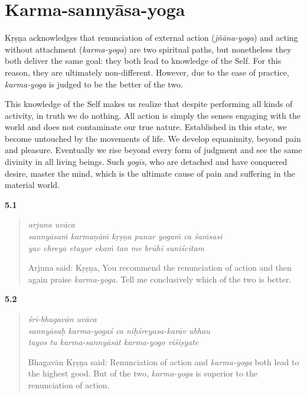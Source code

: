 \chapter{Karma-sannyāsa-yoga}\label{chap-karma-sannyasa-yoga}


\noindent Kṛṣṇa acknowledges that renunciation of external action (\textit{jñāna-yoga}) and acting without attachment (\textit{karma-yoga}) are two spiritual paths, but nonetheless they both deliver the same goal: they both lead to knowledge of the Self. For this reason, they are ultimately non-different. However, due to the ease of practice, \textit{karma-yoga} is judged to be the better of the two.

This knowledge of the Self makes us realize that despite performing all kinds of activity, in truth we do nothing. All action is simply the senses engaging with the world and does not contaminate our true nature. Established in this state, we become untouched by the movements of life. We develop equanimity, beyond pain and pleasure. Eventually we rise beyond every form of judgment and see the same divinity in all living beings. Such \textit{yogīs}, who are detached and have conquered desire, master the mind, which is the ultimate cause of pain and suffering in the material world.


\par\noindent\textbf{5.1}\par
\begin{verse}
\textit{arjuna uvāca} \\
\textit{sannyāsaṁ karmaṇāṁ kṛṣṇa punar yogaṁ ca śaṁsasi} \\
\textit{yac chreya etayor ekaṁ tan me brūhi suniścitam}

\noindent Arjuna said: Kṛṣṇa, You recommend the renunciation of action and then again praise \textit{karma-yoga}. Tell me conclusively which of the two is better.
\end{verse}
\par



\par\noindent\textbf{5.2}\par
\begin{verse}
\textit{śrī-bhagavān uvāca} \\
\textit{sannyāsaḥ karma-yogaś ca niḥśreyasa-karāv ubhau} \\
\textit{tayos tu karma-sannyāsāt karma-yogo viśiṣyate}

\noindent Bhagavān Kṛṣṇa said: Renunciation of action and \textit{karma-yoga} both lead to the highest good. But of the two, \textit{karma-yoga} is superior to the renunciation of action.
\end{verse}
\par



